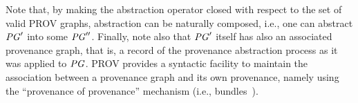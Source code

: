 Note that, by making the abstraction operator closed with respect to the set of valid PROV graphs, abstraction can be naturally composed, i.e., one can abstract $\mathit{PG}'$ into some $\mathit{PG}''$.
%
Finally, note also that $\mathit{PG}'$ itself has also an associated provenance graph, that is, a record of the provenance abstraction process as it was applied to $\mathit{PG}$. 
PROV provides a syntactic facility to maintain the association between a provenance graph and its own provenance, namely using the ``provenance of provenance'' mechanism (i.e., bundles~\citep{w3c-prov-dm}).




%

